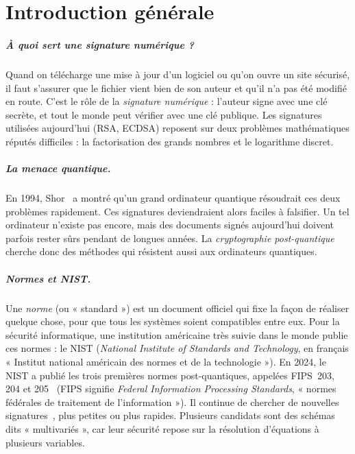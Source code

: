 \chapter*{Introduction générale}
\label{ch:intro}

\paragraph{À quoi sert une signature numérique ?} Quand on télécharge une mise à jour d'un logiciel ou qu'on ouvre un site sécurisé, il faut s'assurer que le fichier vient bien de son auteur et qu'il n'a pas été modifié en route. C'est le rôle de la \emph{signature numérique} : l'auteur signe avec une clé secrète, et tout le monde peut vérifier avec une clé publique. Les signatures utilisées aujourd'hui (RSA, ECDSA) reposent sur deux problèmes mathématiques réputés difficiles : la factorisation des grands nombres et le logarithme discret.

\paragraph{La menace quantique.} En 1994, Shor~\cite{shor} a montré qu'un grand ordinateur quantique résoudrait ces deux problèmes rapidement. Ces signatures deviendraient alors faciles à falsifier. Un tel ordinateur n'existe pas encore, mais des documents signés aujourd'hui doivent parfois rester sûrs pendant de longues années. La \emph{cryptographie post-quantique} cherche donc des méthodes qui résistent aussi aux ordinateurs quantiques.

\paragraph{Normes et NIST.} Une \emph{norme} (ou « standard ») est un document officiel qui fixe la façon de réaliser quelque chose, pour que tous les systèmes soient compatibles entre eux. Pour la sécurité informatique, une institution américaine très suivie dans le monde publie ces normes : le NIST (\emph{National Institute of Standards and Technology}, en français « Institut national américain des normes et de la technologie »). En 2024, le NIST a publié les trois premières normes post-quantiques, appelées FIPS~203, 204 et 205~\cite{nistfips} (FIPS signifie \emph{Federal Information Processing Standards}, « normes fédérales de traitement de l'information »). Il continue de chercher de nouvelles signatures~\cite{nistadd}, plus petites ou plus rapides. Plusieurs candidats sont des schémas dits « multivariés », car leur sécurité repose sur la résolution d'équations à plusieurs variables.

